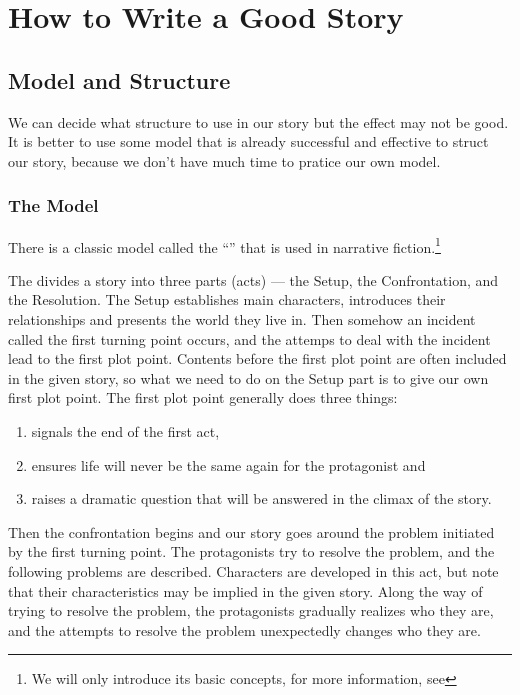 \section{How to Write a Good Story}

\subsection{Model and Structure}
We can decide what structure to use in our story but the effect may not be good. 
It is better to use some model that is already successful and effective to struct 
our story, because we don't have much time to pratice our own model. 

\subsubsection{The \TriActStruct{} Model}
There is a classic model called the ``\TriActStruct '' that is used in narrative 
fiction.\footnote{We will only introduce its basic concepts, for more 
information, see\cite{TriActStruct}}

The \TriActStruct{} divides a story into three parts (acts) --- the Setup, the 
Confrontation, and the Resolution. The Setup establishes main characters, 
introduces their relationships and presents the world they live in. Then somehow 
an incident called the first turning point occurs, and the attemps to deal with 
the incident lead to the first plot point. Contents before the first plot point 
are often included in the given story, so what we need to do on the Setup part is 
to give our own first plot point. The first plot point generally does three 
things:
\begin{enumerate}
\item signals the end of the first act,
\item ensures life will never be the same again for the protagonist and
\item raises a dramatic question that will be answered in the climax of the 
story.
\end{enumerate}

Then the confrontation begins and our story goes around the problem initiated by 
the first turning point. The protagonists try to resolve the problem, and the 
following problems are described. Characters are developed in this act, but 
note that their characteristics may be implied in the given story. Along the way 
of trying to resolve the problem, the protagonists gradually realizes who they 
are, and the attempts to resolve the problem unexpectedly changes who they are.

